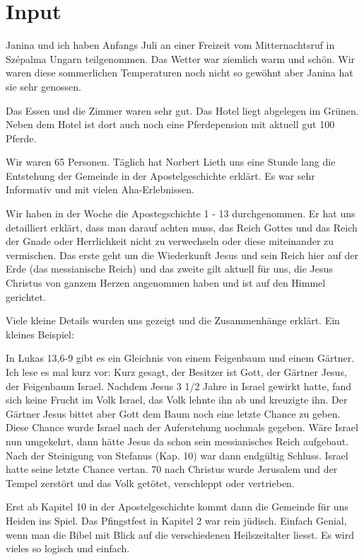 \documentclass{../inc/mybib}
\begin{document}
\section{ Input }
\begin{spacing}{1.5}
Janina und ich haben Anfangs Juli an einer Freizeit vom Mitternachtsruf in Szépalma Ungarn teilgenommen. Das Wetter war ziemlich warm und schön. Wir waren diese sommerlichen Temperaturen noch nicht so gewöhnt aber Janina hat sie sehr genossen.

Das Essen und die Zimmer waren sehr gut. Das Hotel liegt abgelegen im Grünen. Neben dem Hotel ist dort auch noch eine Pferdepension mit aktuell gut 100 Pferde.

Wir waren 65 Personen. Täglich hat Norbert Lieth uns eine Stunde lang die Entstehung der Gemeinde in der Apostelgeschichte erklärt. Es war sehr Informativ und mit vielen Aha-Erlebnissen.

Wir haben in der Woche die Apostegschichte 1 - 13 durchgenommen. Er hat uns detailliert erklärt, dass man darauf achten muss, das Reich Gottes und das Reich der Gnade oder Herrlichkeit nicht zu verwechseln oder diese miteinander zu vermischen. Das erste geht um die Wiederkunft Jesus und sein Reich hier auf der Erde (das messianische Reich) und das zweite gilt aktuell für uns, die Jesus Christus von ganzem Herzen angenommen haben und ist auf den Himmel gerichtet.

Viele kleine Details wurden uns gezeigt und die Zusammenhänge erklärt. Ein kleines Beispiel:

In Lukas 13,6-9 gibt es ein Gleichnis von einem Feigenbaum und einem Gärtner. Ich lese es mal kurz vor:
Kurz gesagt, der Besitzer ist Gott, der Gärtner Jesus, der Feigenbaum Israel. Nachdem Jesus 3 1/2 Jahre in Israel gewirkt hatte, fand sich keine Frucht im Volk Israel, das Volk lehnte ihn ab und kreuzigte ihn. Der Gärtner Jesus bittet aber Gott dem Baum noch eine letzte Chance zu geben. Diese Chance wurde Israel nach der Auferstehung nochmals gegeben. Wäre Israel nun umgekehrt, dann hätte Jesus da schon sein messianisches Reich aufgebaut. Nach der Steinigung von Stefanus (Kap. 10) war dann endgültig Schluss. Israel hatte seine letzte Chance vertan. 70 nach Christus wurde Jerusalem und der Tempel zerstört und das Volk getötet, verschleppt oder vertrieben.

Erst ab Kapitel 10 in der Apostelgeschichte kommt dann die Gemeinde für uns Heiden ins Spiel. Das Pfingstfest in Kapitel 2 war rein jüdisch. Einfach Genial, wenn man die Bibel mit Blick auf die verschiedenen Heilszeitalter liesst. Es wird vieles so logisch und einfach.


\end{spacing}
\end{document}
